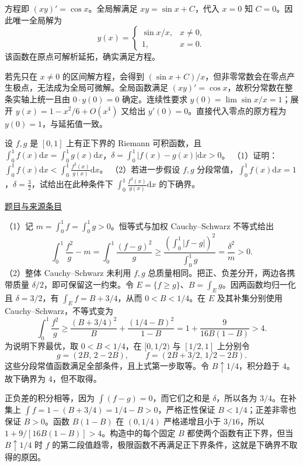 \documentclass[12pt,fontset=fandol]{ctexart}
\begin{document}
\begin{solve}\label{ans:fin15-high:4}

方程即 $(xy)'=\cos x$。全局解满足 $xy=\sin x+C$，代入 $x=0$ 知 $C=0$。因此唯一全局解为
\[
\boxed{y(x)=\begin{cases}\sin x/x,&x\ne0,\\1,&x=0.\end{cases}}
\]
该函数在原点可解析延拓，确实满足方程。

若先只在 $x\ne0$ 的区间解方程，会得到 $(\sin x+C)/x$，但非零常数会在零点产生极点，无法成为全局可微解。全局函数满足 $(xy)'=\cos x$，故积分常数在整条实轴上统一且由 $0\cdot y(0)=0$ 确定。连续性要求 $y(0)=\lim\sin x/x=1$；展开 $y(x)=1-x^2/6+O(x^4)$ 又给出 $y'(0)=0$。直接代入零点的原方程为 $y(0)=1$，与延拓值一致。

\end{solve}

\begin{example}[来源序号7]\label{ex:fin15-high:7}\label{pr:fin15-high:7}

设 $f,g$ 是 $[0,1]$ 上有正下界的 Riemann 可积函数，且 $\int_{0}^{1}f(x)\mathrm{d}x = \int_{0}^{1}g(x)\mathrm{d}x$，$\delta = \int_{0}^{1}|f(x) - g(x)|\mathrm{d}x > 0$。
（1）证明：$\int_{0}^{1}f(x)\mathrm{d}x < \int_{0}^{1}\frac{f^{2}(x)}{g(x)}\mathrm{d}x$。
（2）若进一步假设 $f,g$ 分段常值，$\int_{0}^{1}f(x)\mathrm{d}x = 1$，$\delta = \frac{3}{2}$，试给出在此种条件下 $\int_{0}^{1}\frac{f^{2}(x)}{g(x)}\mathrm{d}x$ 的下确界。

\par\href{https://github.com/lzxcr/cmc-mathematics/blob/64916fa1fdbc3e444a652eca204d5669058ee321/src/problems/finals/15/07.md}{题目与来源条目}

\end{example}

\begin{solve}\label{ans:fin15-high:7}

（1）记 $m=\int_0^1f=\int_0^1g>0$。恒等式与加权 Cauchy--Schwarz 不等式给出
\[
\int_0^1\frac{f^2}{g}-m=\int_0^1\frac{(f-g)^2}{g}
\ge\frac{\left(\int_0^1|f-g|\right)^2}{\int_0^1g}
=\frac{\delta^2}{m}>0.
\]
（2）整体 Cauchy--Schwarz 未利用 $f,g$ 总质量相同。把正、负差分开，两边各携带质量 $\delta/2$，即可保留这一约束。令 $E=\{f\ge g\}$、$B=\int_Eg$。因两函数均归一化且 $\delta=3/2$，有 $\int_Ef=B+3/4$，从而 $0<B<1/4$。在 $E$ 及其补集分别使用 Cauchy--Schwarz，不等式变为
\[
\int_0^1\frac{f^2}{g}
\ge\frac{(B+3/4)^2}{B}+\frac{(1/4-B)^2}{1-B}
=1+\frac9{16B(1-B)}>4.
\]
为说明下界最优，取 $0<B<1/4$，在 $[0,1/2)$ 与 $[1/2,1]$ 上分别令
\[
g=(2B,\,2-2B),\qquad f=(2B+3/2,\,1/2-2B).
\]
这些分段常值函数满足全部条件，且上式第一步取等。令 $B\uparrow1/4$，积分趋于 $4$。故下确界为 $\boxed4$，但不取得。

正负差的积分相等，因为 $\int(f-g)=0$，而它们之和是 $\delta$，所以各为 $3/4$。在补集上 $\int f=1-(B+3/4)=1/4-B>0$，严格正性保证 $B<1/4$；正差非零也保证 $B>0$。函数 $B(1-B)$ 在 $(0,1/4)$ 严格递增且小于 $3/16$，所以 $1+9/[16B(1-B)]>4$。构造中的每个固定 $B$ 都使两个函数有正下界，但当 $B\uparrow1/4$ 时 $f$ 的第二段值趋零，极限函数不再满足正下界条件，这就是下确界不取得的原因。

\end{solve}
\end{document}
